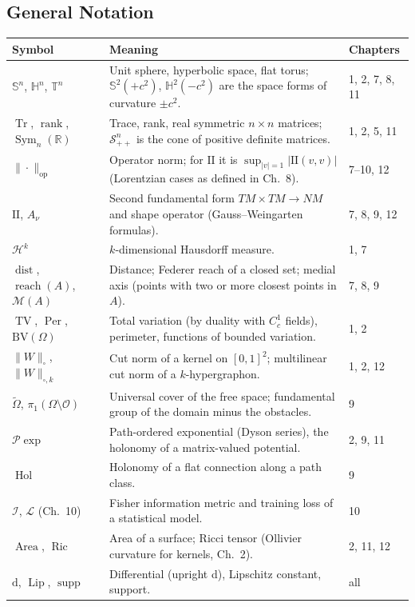 \documentclass[11pt,a4paper,oneside]{article}
\newcommand{\II}{\mathrm{II}}
\newcommand{\BV}{\mathrm{BV}}
\begin{document}
\subsection{General Notation}
\begin{table}[!htbp]
\centering
\scriptsize
\renewcommand{\arraystretch}{1.2}
\begin{tabularx}{\textwidth}{@{} p{3.0cm} X p{2.2cm} @{}}
\toprule
\textbf{Symbol} & \textbf{Meaning} & \textbf{Chapters} \\
\midrule
$\mathbb{S}^{n}$, $\mathbb{H}^n$, $\mathbb{T}^n$ & Unit sphere, hyperbolic space, flat torus; $\mathbb{S}^2(+c^2)$, $\mathbb{H}^2(-c^2)$ are the space forms of curvature $\pm c^2$. & 1, 2, 7, 8, 11 \\
$\operatorname{Tr}$, $\operatorname{rank}$, $\operatorname{Sym}_n(\mathbb{R})$ & Trace, rank, real symmetric $n \times n$ matrices; $\mathcal{S}^n_{++}$ is the cone of positive definite matrices. & 1, 2, 5, 11 \\
$\|\cdot\|_{\mathrm{op}}$ & Operator norm; for $\II$ it is $\sup_{|v|=1}|\II(v,v)|$ (Lorentzian cases as defined in Ch.~8). & 7--10, 12 \\
$\II$, $A_\nu$ & Second fundamental form $TM \times TM \to NM$ and shape operator (Gauss--Weingarten formulas). & 7, 8, 9, 12 \\
$\mathcal{H}^k$ & $k$-dimensional Hausdorff measure. & 1, 7 \\
$\operatorname{dist}$, $\operatorname{reach}(A)$, $\mathcal{M}(A)$ & Distance; Federer reach of a closed set; medial axis (points with two or more closest points in $A$). & 7, 8, 9 \\
$\operatorname{TV}$, $\operatorname{Per}$, $\BV(\Omega)$ & Total variation (by duality with $C^1_c$ fields), perimeter, functions of bounded variation. & 1, 2 \\
$\|W\|_{\square}$, $\|W\|_{\square,k}$ & Cut norm of a kernel on $[0,1]^2$; multilinear cut norm of a $k$-hypergraphon. & 1, 2, 12 \\
$\widetilde{\Omega}$, $\pi_1(\Omega \setminus \mathcal{O})$ & Universal cover of the free space; fundamental group of the domain minus the obstacles. & 9 \\
$\mathcal{P}\exp$ & Path-ordered exponential (Dyson series), the holonomy of a matrix-valued potential. & 2, 9, 11 \\
$\operatorname{Hol}$ & Holonomy of a flat connection along a path class. & 9 \\
$\mathcal{I}$, $\mathcal{L}$ (Ch.~10) & Fisher information metric and training loss of a statistical model. & 10 \\
$\operatorname{Area}$, $\operatorname{Ric}$ & Area of a surface; Ricci tensor (Ollivier curvature for kernels, Ch.~2). & 2, 11, 12 \\
$\mathrm{d}$, $\operatorname{Lip}$, $\operatorname{supp}$ & Differential (upright d), Lipschitz constant, support. & all \\
\bottomrule
\end{tabularx}
\end{table}
\end{document}
